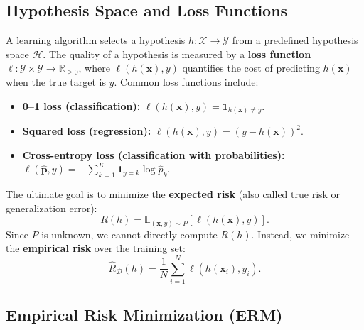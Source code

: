 \documentclass{tufte-handout}
\begin{document}
\subsection{Hypothesis Space and Loss Functions}

A learning algorithm selects a hypothesis $h: \mathcal{X} \to \mathcal{Y}$ from a predefined hypothesis space $\mathcal{H}$. The quality of a hypothesis is measured by a \textbf{loss function} $\ell: \mathcal{Y} \times \mathcal{Y} \to \mathbb{R}_{\ge 0}$, where $\ell(h(\mathbf{x}), y)$ quantifies the cost of predicting $h(\mathbf{x})$ when the true target is $y$. Common loss functions include:
\begin{itemize}
    \item \textbf{0–1 loss (classification):} $\ell(h(\mathbf{x}), y) = \mathbf{1}_{h(\mathbf{x}) \neq y}$.
    \item \textbf{Squared loss (regression):} $\ell(h(\mathbf{x}), y) = (y - h(\mathbf{x}))^2$.
    \item \textbf{Cross-entropy loss (classification with probabilities):} $\ell(\hat{\mathbf{p}}, y) = -\sum_{k=1}^K \mathbf{1}_{y=k} \log \hat{p}_k$.
\end{itemize}

The ultimate goal is to minimize the \textbf{expected risk} (also called true risk or generalization error):
\begin{equation}
    R(h) = \mathbb{E}_{(\mathbf{x}, y) \sim P} \left[ \ell(h(\mathbf{x}), y) \right].
\end{equation}
Since $P$ is unknown, we cannot directly compute $R(h)$. Instead, we minimize the \textbf{empirical risk} over the training set:
\begin{equation}
    \widehat{R}_{\mathcal{D}}(h) = \frac{1}{N} \sum_{i=1}^{N} \ell(h(\mathbf{x}_i), y_i).
\end{equation}

\subsection{Empirical Risk Minimization (ERM)}
\end{document}
